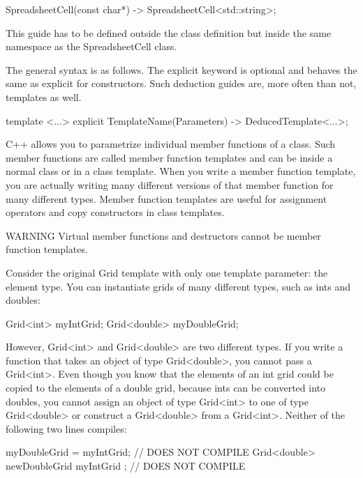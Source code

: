 \begin{cpp}
SpreadsheetCell(const char*) -> SpreadsheetCell<std::string>;
\end{cpp}

This guide has to be defined outside the class definition but inside the same namespace as the SpreadsheetCell class.

The general syntax is as follows. The explicit keyword is optional and behaves the same as explicit for constructors. Such deduction guides are, more often than not, templates as well.

\begin{cpp}
template <...>
explicit TemplateName(Parameters) -> DeducedTemplate<...>;
\end{cpp}


C++ allows you to parametrize individual member functions of a class. Such member functions are called member function templates and can be inside a normal class or in a class template. When you write a member function template, you are actually writing many different versions of that member function for many different types. Member function templates are useful for assignment operators and copy constructors in class templates.

\begin{myWarning}{WARNING}
Virtual member functions and destructors cannot be member function templates.
\end{myWarning}

Consider the original Grid template with only one template parameter: the element type. You can instantiate grids of many different types, such as ints and doubles:

\begin{cpp}
Grid<int> myIntGrid;
Grid<double> myDoubleGrid;
\end{cpp}

However, Grid<int> and Grid<double> are two different types. If you write a function that takes an object of type Grid<double>, you cannot pass a Grid<int>. Even though you know that the elements of an int grid could be copied to the elements of a double grid, because ints can be converted into doubles, you cannot assign an object of type Grid<int> to one of type Grid<double> or construct a Grid<double> from a Grid<int>. Neither of the following two lines compiles:

\begin{cpp}
myDoubleGrid = myIntGrid; // DOES NOT COMPILE
Grid<double> newDoubleGrid { myIntGrid }; // DOES NOT COMPILE
\end{cpp}

